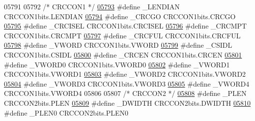 \begin{DoxyCode}
05791 
05792 \textcolor{comment}{/* CRCCON1 */}
\hypertarget{a00009_source_l05793}{}\hyperlink{a00009_aee8a8e644275f749e5b0c82fdf6385d1}{05793} \textcolor{preprocessor}{#define \_LENDIAN CRCCON1bits.LENDIAN}
\hypertarget{a00009_source_l05794}{}\hyperlink{a00009_a1cbd32a5ce8d13820490ade35fffaca3}{05794} \textcolor{preprocessor}{#define \_CRCGO CRCCON1bits.CRCGO}
\hypertarget{a00009_source_l05795}{}\hyperlink{a00009_ae410889a7f2f1cfa088622558f2c8b8c}{05795} \textcolor{preprocessor}{#define \_CRCISEL CRCCON1bits.CRCISEL}
\hypertarget{a00009_source_l05796}{}\hyperlink{a00009_ad4c77fc9608f056374cfbd2ce8fe46cb}{05796} \textcolor{preprocessor}{#define \_CRCMPT CRCCON1bits.CRCMPT}
\hypertarget{a00009_source_l05797}{}\hyperlink{a00009_aa9619f82c4681d374639604a08b376bf}{05797} \textcolor{preprocessor}{#define \_CRCFUL CRCCON1bits.CRCFUL}
\hypertarget{a00009_source_l05798}{}\hyperlink{a00009_a97e0fea316e02578044d9e912fb810af}{05798} \textcolor{preprocessor}{#define \_VWORD CRCCON1bits.VWORD}
\hypertarget{a00009_source_l05799}{}\hyperlink{a00009_aba7108ceb66b0a4ce56c867ce5beca7c}{05799} \textcolor{preprocessor}{#define \_CSIDL CRCCON1bits.CSIDL}
\hypertarget{a00009_source_l05800}{}\hyperlink{a00009_aeead4c5f75df89e784bbb15d51a501ed}{05800} \textcolor{preprocessor}{#define \_CRCEN CRCCON1bits.CRCEN}
\hypertarget{a00009_source_l05801}{}\hyperlink{a00009_a2a8ea8a9913005380bd3e8637671bd0b}{05801} \textcolor{preprocessor}{#define \_VWORD0 CRCCON1bits.VWORD0}
\hypertarget{a00009_source_l05802}{}\hyperlink{a00009_a07745c1266d6d046ff201fd46df841d5}{05802} \textcolor{preprocessor}{#define \_VWORD1 CRCCON1bits.VWORD1}
\hypertarget{a00009_source_l05803}{}\hyperlink{a00009_a80f6ba35197ea8cae8db688d6fc07a25}{05803} \textcolor{preprocessor}{#define \_VWORD2 CRCCON1bits.VWORD2}
\hypertarget{a00009_source_l05804}{}\hyperlink{a00009_adbeb6be88381ca90caa245795c62304d}{05804} \textcolor{preprocessor}{#define \_VWORD3 CRCCON1bits.VWORD3}
\hypertarget{a00009_source_l05805}{}\hyperlink{a00009_a1dc962599f56cd4618c771d9fad62102}{05805} \textcolor{preprocessor}{#define \_VWORD4 CRCCON1bits.VWORD4}
05806 
05807 \textcolor{comment}{/* CRCCON2 */}
\hypertarget{a00009_source_l05808}{}\hyperlink{a00009_ad5a9a36942e19de91dbe24742b143276}{05808} \textcolor{preprocessor}{#define \_PLEN CRCCON2bits.PLEN}
\hypertarget{a00009_source_l05809}{}\hyperlink{a00009_aba4efb6c95893d78cc49999bcbc109ed}{05809} \textcolor{preprocessor}{#define \_DWIDTH CRCCON2bits.DWIDTH}
\hypertarget{a00009_source_l05810}{}\hyperlink{a00009_a14e19edb3c3567cf4e2ae7921e88c6e3}{05810} \textcolor{preprocessor}{#define \_PLEN0 CRCCON2bits.PLEN0}

\end{DoxyCode}
